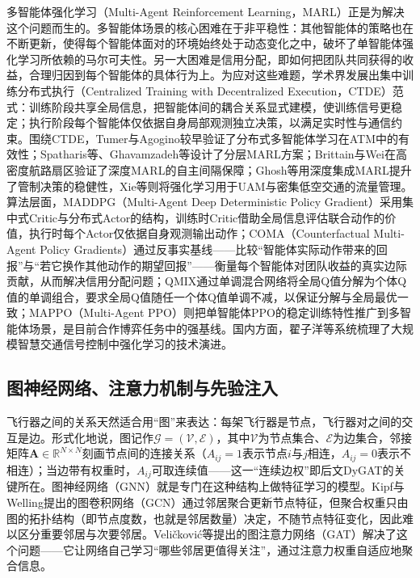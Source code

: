 \documentclass[12pt,a4paper,UTF8]{ctexart}
\begin{document}
多智能体强化学习（Multi-Agent Reinforcement Learning，MARL）正是为解决这个问题而生的。多智能体场景的核心困难在于非平稳性：其他智能体的策略也在不断更新，使得每个智能体面对的环境始终处于动态变化之中，破坏了单智能体强化学习所依赖的马尔可夫性。另一大困难是信用分配，即如何把团队共同获得的收益，合理归因到每个智能体的具体行为上。为应对这些难题，学术界发展出集中训练分布式执行（Centralized Training with Decentralized Execution，CTDE）范式：训练阶段共享全局信息，把智能体间的耦合关系显式建模，使训练信号更稳定；执行阶段每个智能体仅依据自身局部观测独立决策，以满足实时性与通信约束。围绕CTDE，Tumer与Agogino\cite{ref6,ref7,ref14,ref24}较早验证了分布式多智能体学习在ATM中的有效性；Spatharis等\cite{ref11}、Ghavamzadeh等\cite{ref23}设计了分层MARL方案；Brittain与Wei\cite{ref8}在高密度航路扇区验证了深度MARL的自主间隔保障；Ghosh等\cite{ref9}用深度集成MARL提升了管制决策的稳健性，Xie等\cite{ref29}则将强化学习用于UAM与密集低空交通的流量管理。算法层面，MADDPG（Multi-Agent Deep Deterministic Policy Gradient）\cite{ref34}采用集中式Critic与分布式Actor的结构，训练时Critic借助全局信息评估联合动作的价值，执行时每个Actor仅依据自身观测输出动作；COMA（Counterfactual Multi-Agent Policy Gradients）\cite{ref35}通过反事实基线——比较“智能体实际动作带来的回报”与“若它换作其他动作的期望回报”——衡量每个智能体对团队收益的真实边际贡献，从而解决信用分配问题；QMIX\cite{ref33}通过单调混合网络将全局Q值分解为个体Q值的单调组合，要求全局Q值随任一个体Q值单调不减，以保证分解与全局最优一致；MAPPO（Multi-Agent PPO）\cite{ref36}则把单智能体PPO的稳定训练特性推广到多智能体场景，是目前合作博弈任务中的强基线。国内方面，翟子洋等\cite{ref13}系统梳理了大规模智慧交通信号控制中强化学习的技术演进。

\subsection{图神经网络、注意力机制与先验注入}

飞行器之间的关系天然适合用“图”来表达：每架飞行器是节点，飞行器对之间的交互是边。形式化地说，图记作$\mathcal{G}=(\mathcal{V},\mathcal{E})$，其中$\mathcal{V}$为节点集合、$\mathcal{E}$为边集合，邻接矩阵$\bm{A}\in\mathbb{R}^{N\times N}$刻画节点间的连接关系（$A_{ij}=1$表示节点$i$与$j$相连，$A_{ij}=0$表示不相连）；当边带有权重时，$A_{ij}$可取连续值——这一“连续边权”即后文DyGAT的关键所在。图神经网络（GNN）就是专门在这种结构上做特征学习的模型。Kipf与Welling\cite{ref32}提出的图卷积网络（GCN）通过邻居聚合更新节点特征，但聚合权重只由图的拓扑结构（即节点度数，也就是邻居数量）决定，不随节点特征变化，因此难以区分重要邻居与次要邻居。Veli\v{c}kovi\'c等\cite{ref31}提出的图注意力网络（GAT）解决了这个问题——它让网络自己学习“哪些邻居更值得关注”，通过注意力权重自适应地聚合信息。
\end{document}
